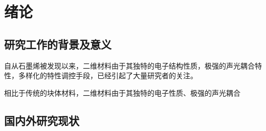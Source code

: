 \chapter{绪\hspace{6pt}论}

\section{研究工作的背景及意义}
自从石墨烯被发现以来，二维材料由于其独特的电子结构性质，极强的声光耦合特性，多样化的特性调控手段，已经引起了大量研究者的关注。

相比于传统的块体材料，二维材料由于其独特的电子性质、极强的声光耦合


\section{国内外研究现状}